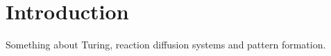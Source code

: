 \documentclass{article}
\begin{document}
	\section{Introduction}
	
	Something about Turing, reaction diffusion systems and pattern formation.
\end{document}
